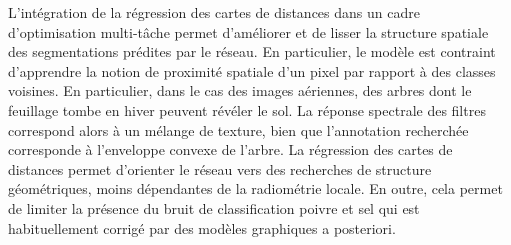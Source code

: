 L'intégration de la régression des cartes de distances dans un cadre d'optimisation multi-tâche permet d'améliorer et de lisser la structure spatiale des segmentations prédites par le réseau. En particulier, le modèle est contraint d'apprendre la notion de proximité spatiale d'un pixel par rapport à des classes voisines. En particulier, dans le cas des images aériennes, des arbres dont le feuillage tombe en hiver peuvent révéler le sol. La réponse spectrale des filtres correspond alors à un mélange de texture, bien que l'annotation recherchée corresponde à l'enveloppe convexe de l'arbre. La régression des cartes de distances permet d'orienter le réseau vers des recherches de structure géométriques, moins dépendantes de la radiométrie locale. En outre, cela permet de limiter la présence du bruit de classification poivre et sel qui est habituellement corrigé par des modèles graphiques a posteriori.



